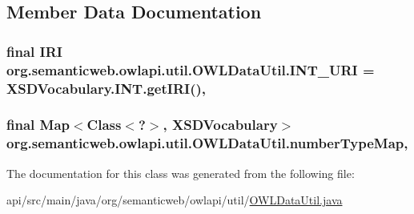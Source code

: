 \subsection{Member Data Documentation}
\hypertarget{classorg_1_1semanticweb_1_1owlapi_1_1util_1_1_o_w_l_data_util_a121f400b33c6e04f475a9fd3073c8f18}{
\subsubsection[{I\-N\-T\-\_\-\-U\-R\-I}]{\setlength{\rightskip}{0pt plus 5cm}final {\bf I\-R\-I} org.\-semanticweb.\-owlapi.\-util.\-O\-W\-L\-Data\-Util.\-I\-N\-T\-\_\-\-U\-R\-I = X\-S\-D\-Vocabulary.\-I\-N\-T.\-get\-I\-R\-I()\hspace{0.3cm}{\ttfamily [static]}, {\ttfamily [private]}}}\label{classorg_1_1semanticweb_1_1owlapi_1_1util_1_1_o_w_l_data_util_a121f400b33c6e04f475a9fd3073c8f18}
\hypertarget{classorg_1_1semanticweb_1_1owlapi_1_1util_1_1_o_w_l_data_util_a836b4be0ee00df5959fbaa1de840f15d}{
\subsubsection[{number\-Type\-Map}]{\setlength{\rightskip}{0pt plus 5cm}final Map$<$Class$<$?$>$, {\bf X\-S\-D\-Vocabulary}$>$ org.\-semanticweb.\-owlapi.\-util.\-O\-W\-L\-Data\-Util.\-number\-Type\-Map\hspace{0.3cm}{\ttfamily [static]}, {\ttfamily [private]}}}\label{classorg_1_1semanticweb_1_1owlapi_1_1util_1_1_o_w_l_data_util_a836b4be0ee00df5959fbaa1de840f15d}


The documentation for this class was generated from the following file\-:\begin{DoxyCompactItemize}
\item 
api/src/main/java/org/semanticweb/owlapi/util/\hyperlink{_o_w_l_data_util_8java}{O\-W\-L\-Data\-Util.\-java}\end{DoxyCompactItemize}
